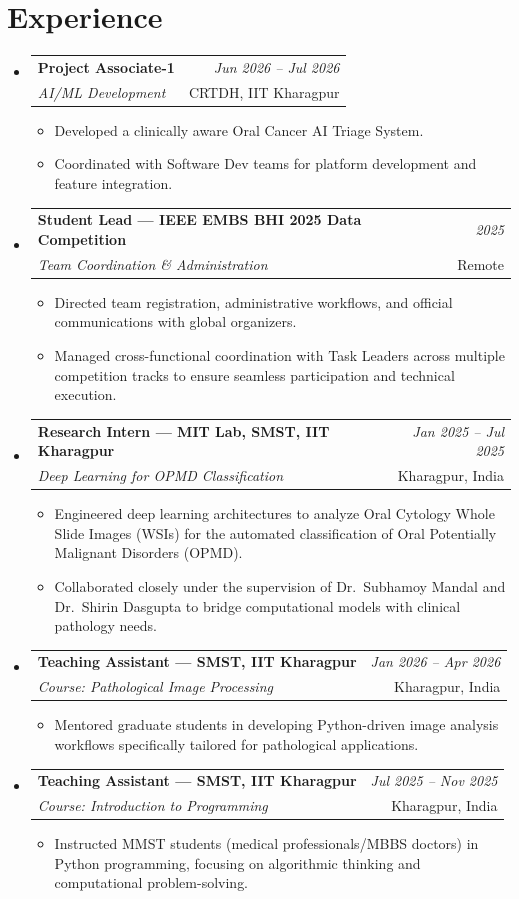 \documentclass[a4paper,11pt]{article}
\makeatletter
\newcommand{\resumeSubheading}[4]{
\item
    \begin{tabular*}{0.98\textwidth}[t]{l@{\extracolsep{\fill}}r}
        \textbf{#1} & \textit{\footnotesize{#4}} \\
        \textit{\footnotesize{#3}} &  \footnotesize{#2}\\
    \end{tabular*}
}
\newcommand{\resumeItem}[1]{\item #1}
\newcommand{\resumeListStart}{\begin{itemize}[leftmargin=*]}
\newcommand{\resumeListEnd}{\end{itemize}\vspace{-1mm}}
\makeatother
\begin{document}
\section*{Experience}
\begin{itemize}[leftmargin=*]

  \resumeSubheading
    {Project Associate-1}{CRTDH, IIT Kharagpur}
    {AI/ML Development}{Jun 2026 -- Jul 2026}
    \resumeListStart
      \resumeItem{Developed a clinically aware Oral Cancer AI Triage System.}
      \resumeItem{Coordinated with Software Dev teams for platform development and feature integration.}
    \resumeListEnd

  \resumeSubheading
    {Student Lead — IEEE EMBS BHI 2025 Data Competition}{Remote}
    {Team Coordination \& Administration}{2025}
    \resumeListStart
      \resumeItem{Directed team registration, administrative workflows, and official communications with global organizers.}
      \resumeItem{Managed cross-functional coordination with Task Leaders across multiple competition tracks to ensure seamless participation and technical execution.}
    \resumeListEnd

  \resumeSubheading
    {Research Intern — MIT Lab, SMST, IIT Kharagpur}{Kharagpur, India}
    {Deep Learning for OPMD Classification}{Jan 2025 -- Jul 2025}
    \resumeListStart
      \resumeItem{Engineered deep learning architectures to analyze Oral Cytology Whole Slide Images (WSIs) for the automated classification of Oral Potentially Malignant Disorders (OPMD).}
      \resumeItem{Collaborated closely under the supervision of Dr.\ Subhamoy Mandal and Dr.\ Shirin Dasgupta to bridge computational models with clinical pathology needs.}
    \resumeListEnd

  \resumeSubheading
    {Teaching Assistant — SMST, IIT Kharagpur}{Kharagpur, India}
    {Course: Pathological Image Processing}{Jan 2026 -- Apr 2026}
    \resumeListStart
      \resumeItem{Mentored graduate students in developing Python-driven image analysis workflows specifically tailored for pathological applications.}
    \resumeListEnd

  \resumeSubheading
    {Teaching Assistant — SMST, IIT Kharagpur}{Kharagpur, India}
    {Course: Introduction to Programming}{Jul 2025 -- Nov 2025}
    \resumeListStart
      \resumeItem{Instructed MMST students (medical professionals/MBBS doctors) in Python programming, focusing on algorithmic thinking and computational problem-solving.}
    \resumeListEnd
\end{itemize}
\end{document}
